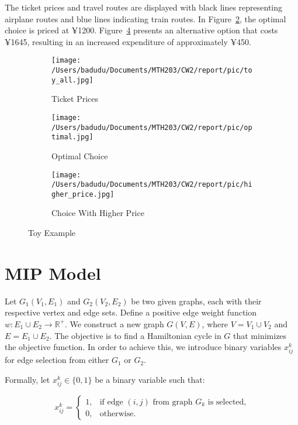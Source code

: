 \documentclass{article} %
\begin{document}
The ticket prices and travel routes are displayed with black lines representing airplane routes and blue lines indicating train routes. In Figure~\ref{fig:Optimalchoice}, the optimal choice is priced at ¥1200. Figure~\ref{fig:Higherprice} presents an alternative option that costs ¥1645, resulting in an increased expenditure of approximately ¥450.
\begin{figure}[!ht]
  \centering
  \begin{subfigure}{0.3\textwidth}
    \texttt{[image: /Users/badudu/Documents/MTH203/CW2/report/pic/toy\_all.jpg]}
    \caption{Ticket Prices}%
    \label{fig:Ticketprice}
  \end{subfigure}
  \hfill %
  \begin{subfigure}{0.3\textwidth}
    \texttt{[image: /Users/badudu/Documents/MTH203/CW2/report/pic/optimal.jpg]}
    \caption{Optimal Choice}%
    \label{fig:Optimalchoice}
  \end{subfigure}%
  \hfill %
  \begin{subfigure}{0.3\textwidth}
    \texttt{[image: /Users/badudu/Documents/MTH203/CW2/report/pic/higher\_price.jpg]}
    \caption{Choice With Higher Price}%
    \label{fig:Higherprice}
  \end{subfigure}%
  \caption{Toy Example}
\end{figure}
\clearpage
\section{MIP Model}
Let $G_1(V_1, E_1)$ and $G_2(V_2, E_2)$ be two given graphs, each with their
respective vertex and edge sets. Define a positive edge weight function $w :
  E_1 \cup E_2 \rightarrow \mathbb{R}^+$. We construct a new graph $G(V, E)$,
where $V = V_1 \cup V_2$ and $E = E_1 \cup E_2$. The objective is to find a
Hamiltonian cycle in $G$ that minimizes the objective function. In order to
achieve this, we introduce binary variables $x_{ij}^k$ for edge selection from
either $G_1$ or $G_2$.

Formally, let $x_{ij}^k \in \{0, 1\}$ be a binary variable such that:

\begin{equation*}
  x_{ij}^k =
  \begin{cases}
    1, & \text{if edge } (i, j) \text{ from graph } G_k \text{ is selected,} \\
    0, & \text{otherwise.}
  \end{cases}
\end{equation*}
\end{document}
